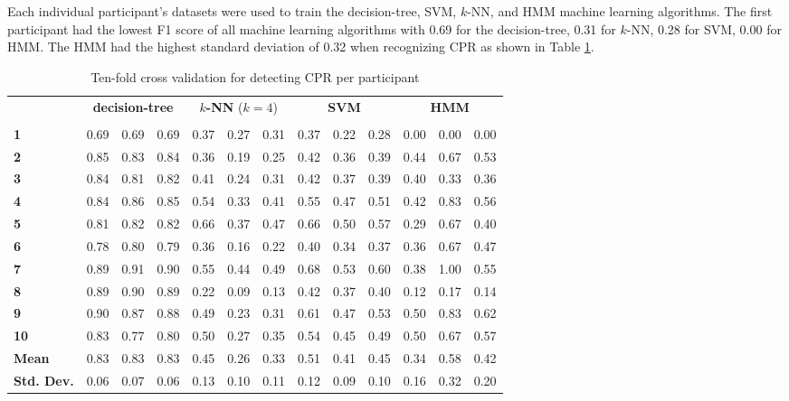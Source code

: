 \par Each individual participant's datasets were used to train the decision-tree, SVM, $k$-NN, and HMM machine learning algorithms. The first participant had the lowest F1 score of all machine learning algorithms with 0.69 for the decision-tree, 0.31 for $k$-NN, 0.28 for SVM, 0.00 for HMM. The HMM had the highest standard deviation of 0.32 when recognizing CPR as shown in Table \ref{tab:cpr:ml}.
\newcommand*\rotv{\multirow{2}{*}{\rotatebox[origin=c]{45}}}
\begin{table}[]
	\centering
	\begin{tabular}{lllllllllllll}
		\multirow{2}{*}{\rotatebox[origin=c]{45}{\textbf{Participant}}} & \multicolumn{3}{c}{\textbf{decision-tree}} & \multicolumn{3}{c}{\textbf{$k$-NN} ($k=4$)} & \multicolumn{3}{c}{\textbf{SVM}} & \multicolumn{3}{c}{\textbf{HMM}} \\
		 & \rot{Precision}     & \rot{Recall}    & \rot{F1}    & \rot{Precision}     & \rot{Recall}    & \rot{F1}  & \rot{Precision}     & \rot{Recall}    & \rot{F1} & \rot{Precision}     & \rot{Recall}    & \rot{F1} \\
		\textbf{1}   & 0.69 & 0.69 & 0.69 & 0.37 & 0.27 & 0.31 & 0.37 & 0.22 & 0.28 & 0.00 & 0.00 & 0.00 \\
		\textbf{2}   & 0.85 & 0.83 & 0.84 & 0.36 & 0.19 & 0.25 & 0.42 & 0.36 & 0.39 & 0.44 & 0.67 & 0.53 \\
		\textbf{3}   & 0.84 & 0.81 & 0.82 & 0.41 & 0.24 & 0.31 & 0.42 & 0.37 & 0.39 & 0.40 & 0.33 & 0.36 \\
		\textbf{4}   & 0.84 & 0.86 & 0.85 & 0.54 & 0.33 & 0.41 & 0.55 & 0.47 & 0.51 & 0.42 & 0.83 & 0.56 \\
		\textbf{5}   & 0.81 & 0.82 & 0.82 & 0.66 & 0.37 & 0.47 & 0.66 & 0.50 & 0.57 & 0.29 & 0.67 & 0.40 \\
		\textbf{6}   & 0.78 & 0.80 & 0.79 & 0.36 & 0.16 & 0.22 & 0.40 & 0.34 & 0.37 & 0.36 & 0.67 & 0.47 \\
		\textbf{7}   & 0.89 & 0.91 & 0.90 & 0.55 & 0.44 & 0.49 & 0.68 & 0.53 & 0.60 & 0.38 & 1.00 & 0.55 \\
		\textbf{8}   & 0.89 & 0.90 & 0.89 & 0.22 & 0.09 & 0.13 & 0.42 & 0.37 & 0.40 & 0.12 & 0.17 & 0.14 \\
		\textbf{9}   & 0.90 & 0.87 & 0.88 & 0.49 & 0.23 & 0.31 & 0.61 & 0.47 & 0.53 & 0.50 & 0.83 & 0.62 \\
		\textbf{10} & 0.83 & 0.77 & 0.80 & 0.50 & 0.27 & 0.35 & 0.54 & 0.45 & 0.49 & 0.50 & 0.67 & 0.57 \\
		\hline
		\textbf{Mean} & 0.83 & 0.83 & 0.83 & 0.45 & 0.26 & 0.33 & 0.51 & 0.41 & 0.45 & 0.34 & 0.58 & 0.42 \\
		\textbf{Std. Dev.} & 0.06 & 0.07 & 0.06 & 0.13 & 0.10 & 0.11 & 0.12 & 0.09 & 0.10 & 0.16 & 0.32 & 0.20
	\end{tabular}
	\caption{Ten-fold cross validation for detecting CPR per participant}
	\label{tab:cpr:ml}
\end{table}
